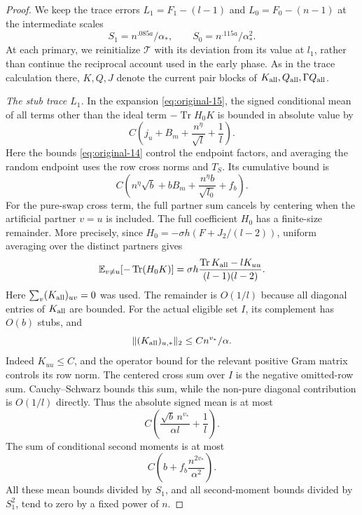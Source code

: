 \begin{proof}
We keep the trace errors $L_1=F_1-(l-1)$ and $L_0=F_0-(n-1)$
at the intermediate scales
\[
 S_1=n^{.085a}/\alpha_*,\qquad S_0=n^{.115a}/\alpha_*^2.
\]
At each primary, we reinitialize $\mathcal T$ with its deviation from
its value at $l_1$, rather than continue the reciprocal account used in the early
phase.  As in the trace calculation there, $K,Q,J$ denote the current
pair blocks of $K_{\rm all},Q_{\rm all},\Gamma Q_{\rm all}$.

\emph{The stub trace $L_1$.}
In the expansion \eqref{eq:original-15}, the signed conditional mean of all terms
other than the ideal term $-\operatorname{Tr}H_0K$ is bounded in
absolute value by
\[
 C\left(j_u+B_m+\frac{n^\eta}{\sqrt l}+\frac1l\right).
\]
Here the bounds \eqref{eq:original-14} control the endpoint factors,
and averaging the random endpoint uses the row cross norms and
$T_S$.  Its cumulative bound is
\[
 C\left(n^\eta\sqrt b+bB_m+
             \frac{n^\eta b}{\sqrt{l_0}}+f_b\right).
\]
For the pure-swap cross term, the full partner sum cancels by
centering when the artificial partner $v=u$ is included.  The full
coefficient $H_0$ has a finite-size remainder.  More precisely,
since $H_0=-\sigma h(F+J_2/(l-2))$, uniform averaging over the
distinct partners gives
\[
 \mathbb E_{v\ne u}[-\operatorname{Tr}(H_0K)]
   =\sigma h\frac{\operatorname{Tr}K_{\rm all}-lK_{uu}}
                       {(l-1)(l-2)}.
\]
Here $\sum_v(K_{\rm all})_{uv}=0$ was used.  The remainder is
$O(1/l)$ because all diagonal entries of $K_{\rm all}$ are bounded.
For the actual eligible set $I$, its complement has $O(b)$ stubs, and
\[
 \|(K_{\rm all})_{u,*}\|_2\leq Cn^{v_*}/\alpha.
\]
Indeed $K_{uu}\leq C$, and the operator bound for the relevant
positive Gram matrix controls its row norm.  The centered cross sum
over $I$ is the negative omitted-row sum.  Cauchy--Schwarz bounds
this sum, while the non-pure diagonal contribution is $O(1/l)$
directly.  Thus the absolute signed mean is at most
\[
 C\left(\frac{\sqrt b\,n^{v_*}}{\alpha l}+\frac1l\right).
\]
The sum of conditional second moments is at most
\[
 C\left(b+f_b\frac{n^{2v_*}}{\alpha^2}\right).
\]
All these mean bounds divided by $S_1$, and all second-moment
bounds divided by $S_1^2$, tend to zero by a fixed power of $n$.


\end{proof}
